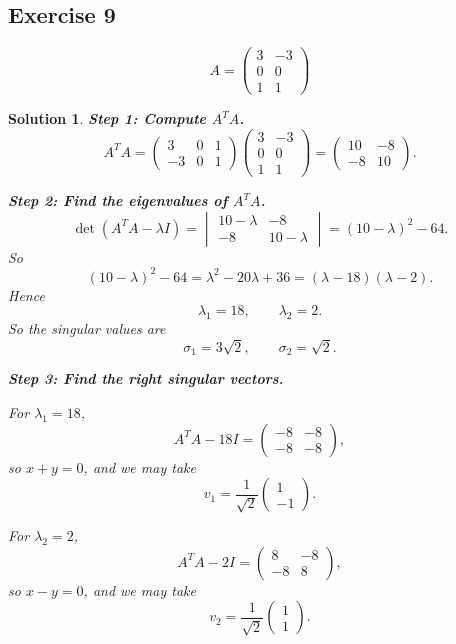 \documentclass[11pt,a4paper]{article}
\theoremstyle{sol}
\newtheorem*{solution}{Solution}
\begin{document}
\clearpage
\subsection*{Exercise 9}
\[
A=\begin{pmatrix}3&-3\\0&0\\1&1\end{pmatrix}
\]

\begin{solution}
\textbf{Step 1: Compute $A^TA$.}
\[
A^TA=
\begin{pmatrix}
3&0&1\\
-3&0&1
\end{pmatrix}
\begin{pmatrix}
3&-3\\
0&0\\
1&1
\end{pmatrix}
=
\begin{pmatrix}
10&-8\\
-8&10
\end{pmatrix}.
\]

\textbf{Step 2: Find the eigenvalues of $A^TA$.}
\[
\det(A^TA-\lambda I)
=
\begin{vmatrix}
10-\lambda&-8\\
-8&10-\lambda
\end{vmatrix}
=(10-\lambda)^2-64.
\]
So
\[
(10-\lambda)^2-64
=\lambda^2-20\lambda+36
=(\lambda-18)(\lambda-2).
\]
Hence
\[
\lambda_1=18,\qquad \lambda_2=2.
\]
So the singular values are
\[
\sigma_1=3\sqrt2,\qquad \sigma_2=\sqrt2.
\]

\textbf{Step 3: Find the right singular vectors.}

For $\lambda_1=18$,
\[
A^TA-18I=
\begin{pmatrix}
-8&-8\\
-8&-8
\end{pmatrix},
\]
so $x+y=0$, and we may take
\[
v_1=\frac{1}{\sqrt2}\begin{pmatrix}1\\-1\end{pmatrix}.
\]

For $\lambda_2=2$,
\[
A^TA-2I=
\begin{pmatrix}
8&-8\\
-8&8
\end{pmatrix},
\]
so $x-y=0$, and we may take
\[
v_2=\frac{1}{\sqrt2}\begin{pmatrix}1\\1\end{pmatrix}.
\]


\end{solution}
\end{document}
